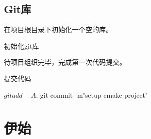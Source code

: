 \begin{content}
\subsection{Git库}

在项目根目录下初始化一个空的库。

\begin{nodiff}{初始化git库}
\end{nodiff}  

待项目组织完毕，完成第一次代码提交。

\begin{nodiff}{提交代码}
 \begin{c++}
$ git add -A .
$ git commit -m"setup cmake project"
 \end{c++}
\end{nodiff}

\end{content}

\section{伊始}

